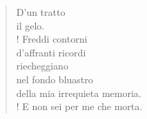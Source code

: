 
\begin{verse}
    D'un tratto\\
    il gelo.\\!
    Freddi contorni\\
    d'affranti ricordi\\
    riecheggiano\\
    nel fondo bluastro\\
    della mia irrequieta memoria.\\!
    E non sei per me che morta.
\end{verse} 